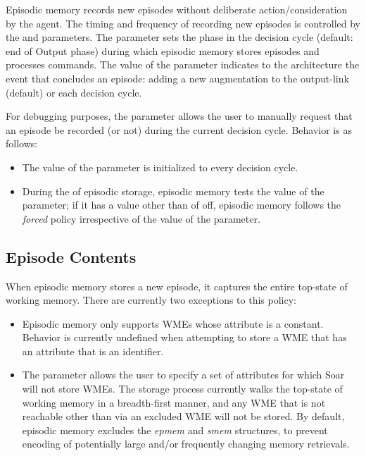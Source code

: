 Episodic memory records new episodes without deliberate action/consideration by the agent. 
The timing and frequency of recording new episodes is controlled by the  and  parameters.  
The  parameter sets the phase in the decision cycle (default: end of Output phase) during which episodic memory stores episodes and processes commands.  
The value of the  parameter indicates to the architecture the event that concludes an episode: adding a new augmentation to the output-link (default) or each decision cycle.

For debugging purposes, the  parameter allows the user to manually request that an episode be recorded (or not) during the current decision cycle.  
Behavior is as follows:

\begin{itemize}
\item 
The value of the  parameter is initialized to  every decision cycle.

\item 
During the  of episodic storage, episodic memory tests the value of the  parameter; if it has a value other than of off, episodic memory follows the \emph{forced} policy irrespective of the value of the  parameter.

\end{itemize}

\subsection{Episode Contents}
When episodic memory stores a new episode, it captures the entire top-state of working memory. 
There are currently two exceptions to this policy:

\begin{itemize}
\item 
Episodic memory only supports WMEs whose attribute is a constant. 
Behavior is currently undefined when attempting to store a WME that has an attribute that is an identifier.

\item 
The  parameter allows the user to specify a set of attributes for which Soar will not store WMEs. 
The storage process currently walks the top-state of working memory in a breadth-first manner, and any WME that is not reachable other than via an excluded WME will not be stored. 
By default, episodic memory excludes the \emph{epmem} and \emph{smem} structures, to prevent encoding of potentially large and/or frequently changing memory retrievals.

\end{itemize}

